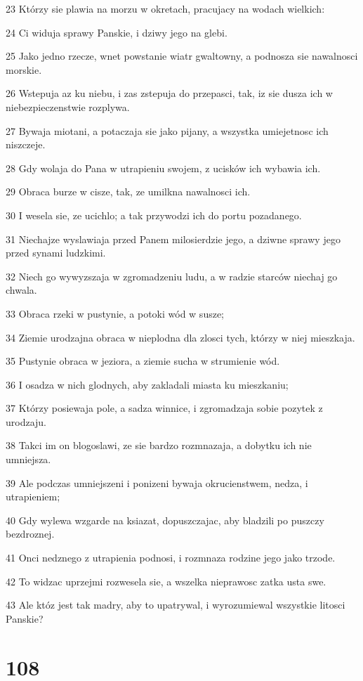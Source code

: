 \par 23 Którzy sie plawia na morzu w okretach, pracujacy na wodach wielkich:
\par 24 Ci widuja sprawy Panskie, i dziwy jego na glebi.
\par 25 Jako jedno rzecze, wnet powstanie wiatr gwaltowny, a podnosza sie nawalnosci morskie.
\par 26 Wstepuja az ku niebu, i zas zstepuja do przepasci, tak, iz sie dusza ich w niebezpieczenstwie rozplywa.
\par 27 Bywaja miotani, a potaczaja sie jako pijany, a wszystka umiejetnosc ich niszczeje.
\par 28 Gdy wolaja do Pana w utrapieniu swojem, z ucisków ich wybawia ich.
\par 29 Obraca burze w cisze, tak, ze umilkna nawalnosci ich.
\par 30 I wesela sie, ze ucichlo; a tak przywodzi ich do portu pozadanego.
\par 31 Niechajze wyslawiaja przed Panem milosierdzie jego, a dziwne sprawy jego przed synami ludzkimi.
\par 32 Niech go wywyzszaja w zgromadzeniu ludu, a w radzie starców niechaj go chwala.
\par 33 Obraca rzeki w pustynie, a potoki wód w susze;
\par 34 Ziemie urodzajna obraca w nieplodna dla zlosci tych, którzy w niej mieszkaja.
\par 35 Pustynie obraca w jeziora, a ziemie sucha w strumienie wód.
\par 36 I osadza w nich glodnych, aby zakladali miasta ku mieszkaniu;
\par 37 Którzy posiewaja pole, a sadza winnice, i zgromadzaja sobie pozytek z urodzaju.
\par 38 Takci im on blogoslawi, ze sie bardzo rozmnazaja, a dobytku ich nie umniejsza.
\par 39 Ale podczas umniejszeni i ponizeni bywaja okrucienstwem, nedza, i utrapieniem;
\par 40 Gdy wylewa wzgarde na ksiazat, dopuszczajac, aby bladzili po puszczy bezdroznej.
\par 41 Onci nedznego z utrapienia podnosi, i rozmnaza rodzine jego jako trzode.
\par 42 To widzac uprzejmi rozwesela sie, a wszelka nieprawosc zatka usta swe.
\par 43 Ale któz jest tak madry, aby to upatrywal, i wyrozumiewal wszystkie litosci Panskie?

\chapter{108}

